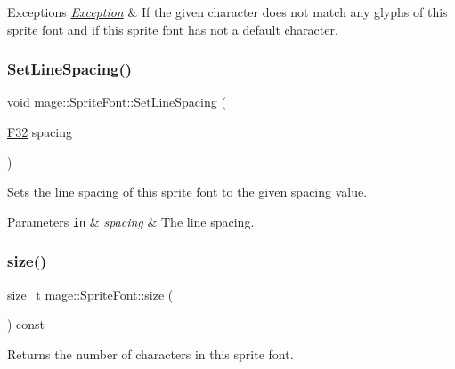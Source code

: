 \begin{DoxyExceptions}{Exceptions}
{\em \hyperlink{classmage_1_1_exception}{Exception}} & If the given character does not match any glyphs of this sprite font and if this sprite font has not a default character. \\
\hline
\end{DoxyExceptions}
\hypertarget{classmage_1_1_sprite_font_afcbdf433fea7da7802c23ef53eb9e5ad}{}\label{classmage_1_1_sprite_font_afcbdf433fea7da7802c23ef53eb9e5ad} 
\subsubsection{\texorpdfstring{Set\+Line\+Spacing()}{SetLineSpacing()}}
{\footnotesize\ttfamily void mage\+::\+Sprite\+Font\+::\+Set\+Line\+Spacing (\begin{DoxyParamCaption}\item[{\hyperlink{namespacemage_aa97e833b45f06d60a0a9c4fc22ae02c0}{F32}}]{spacing }\end{DoxyParamCaption})\hspace{0.3cm}{\ttfamily [noexcept]}}

Sets the line spacing of this sprite font to the given spacing value.


\begin{DoxyParams}[1]{Parameters}
\mbox{\tt in}  & {\em spacing} & The line spacing. \\
\hline
\end{DoxyParams}
\hypertarget{classmage_1_1_sprite_font_a2c80b7c8c460c6fc9edacc78ba4476cb}{}\label{classmage_1_1_sprite_font_a2c80b7c8c460c6fc9edacc78ba4476cb} 
\subsubsection{\texorpdfstring{size()}{size()}}
{\footnotesize\ttfamily size\+\_\+t mage\+::\+Sprite\+Font\+::size (\begin{DoxyParamCaption}{ }\end{DoxyParamCaption}) const\hspace{0.3cm}{\ttfamily [noexcept]}}

Returns the number of characters in this sprite font.


